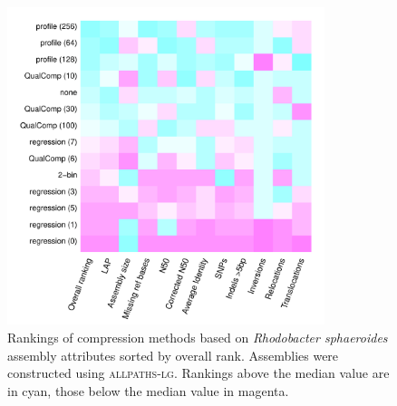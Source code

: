 \documentclass{bioinfo}
\begin{document}
\begin{figure}[!tbp]
\centerline{\includegraphics[width=3.65in]{rhodo_assembly_results.pdf}}
\caption{Rankings of compression methods based on \textit{Rhodobacter
    sphaeroides} assembly attributes sorted by overall
  rank. Assemblies were constructed using \textsc{allpaths-lg}.
  Rankings above the median value are in cyan, those below the median
  value in magenta.}
  \label{fig:assembly_ranks}
\end{figure}
\end{document}
